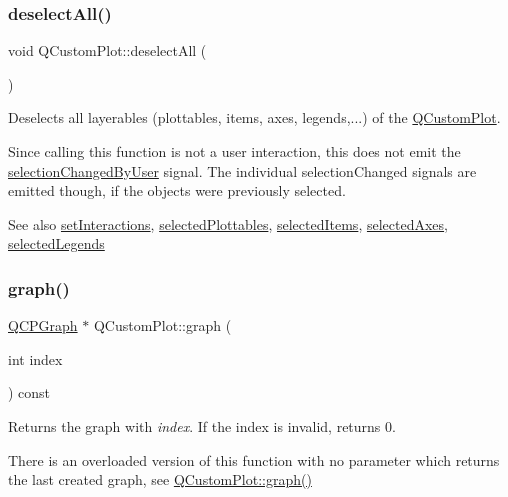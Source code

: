 \subsubsection{\texorpdfstring{deselect\+All()}{deselectAll()}}
{\footnotesize\ttfamily void Q\+Custom\+Plot\+::deselect\+All (\begin{DoxyParamCaption}{ }\end{DoxyParamCaption})}

Deselects all layerables (plottables, items, axes, legends,...) of the \hyperlink{class_q_custom_plot}{Q\+Custom\+Plot}.

Since calling this function is not a user interaction, this does not emit the \hyperlink{class_q_custom_plot_a500c64a109bc773c973ad274f2fa4190}{selection\+Changed\+By\+User} signal. The individual selection\+Changed signals are emitted though, if the objects were previously selected.

\begin{DoxySeeAlso}{See also}
\hyperlink{class_q_custom_plot_a5ee1e2f6ae27419deca53e75907c27e5}{set\+Interactions}, \hyperlink{class_q_custom_plot_a747faaab57c56891e901a1e97fa4359a}{selected\+Plottables}, \hyperlink{class_q_custom_plot_afda487bcf2d6cf1a57173d82495e29ba}{selected\+Items}, \hyperlink{class_q_custom_plot_a7e6b07792b1cb2c31681596582d14dbe}{selected\+Axes}, \hyperlink{class_q_custom_plot_ac87624ddff1cbf4064781a8e8ae321c4}{selected\+Legends} 
\end{DoxySeeAlso}
\hypertarget{class_q_custom_plot_a6ecae130f684b25276fb47bd3a5875c6}{}\label{class_q_custom_plot_a6ecae130f684b25276fb47bd3a5875c6} 
\subsubsection{\texorpdfstring{graph()}{graph()}\hspace{0.1cm}{\footnotesize\ttfamily [1/2]}}
{\footnotesize\ttfamily \hyperlink{class_q_c_p_graph}{Q\+C\+P\+Graph} $\ast$ Q\+Custom\+Plot\+::graph (\begin{DoxyParamCaption}\item[{int}]{index }\end{DoxyParamCaption}) const}

Returns the graph with {\itshape index}. If the index is invalid, returns 0.

There is an overloaded version of this function with no parameter which returns the last created graph, see \hyperlink{class_q_custom_plot_a6ecae130f684b25276fb47bd3a5875c6}{Q\+Custom\+Plot\+::graph()}

